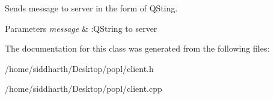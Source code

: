 Sends message to server in the form of Q\+Sting. 


\begin{DoxyParams}{Parameters}
{\em message} & \+:Q\+String to server \\
\hline
\end{DoxyParams}


The documentation for this class was generated from the following files\+:\begin{DoxyCompactItemize}
\item 
/home/siddharth/\+Desktop/popl/client.\+h\item 
/home/siddharth/\+Desktop/popl/client.\+cpp\end{DoxyCompactItemize}
